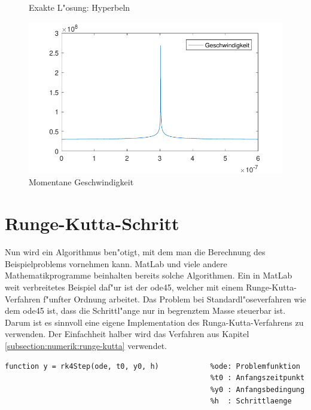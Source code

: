 \begin{refsection}
\begin{figure}
\caption{Exakte L"osung: Hyperbeln}
\label{image:hyperbelOptimal}
\end{figure}
\begin{figure}
\centering
\includegraphics{schrittlaenge/images/geschwindigkeitHyperbel.pdf}
\caption{Momentane Geschwindigkeit}
\label{image:geschwindigkeitHyperbel}
\end{figure}

\section{Runge-Kutta-Schritt\label{section:schrittlaenge:runge-kutta}}

Nun wird ein Algorithmus ben"otigt, mit dem man die Berechnung des Beispielproblems vornehmen kann.
MatLab und viele andere Mathematikprogramme beinhalten bereits solche Algorithmen.
Ein in MatLab weit verbreitetes Beispiel daf"ur ist der ode45, welcher mit einem Runge-Kutta-Verfahren f"unfter Ordnung arbeitet.
Das Problem bei Standardl"oseverfahren wie dem ode45 ist, dass die Schrittl"ange nur in begrenztem Masse steuerbar ist. 
Darum ist es sinnvoll eine eigene Implementation des Runga-Kutta-Verfahrens zu verwenden. Der Einfachheit halber wird das Verfahren aus Kapitel \ref{subsection:numerik:runge-kutta} verwendet. 
\begin{lstlisting}[style=Matlab, caption=Runge-Kutta-Schritt, captionpos=b, label=code:rk4Step] 
function y = rk4Step(ode, t0, y0, h)            %ode: Problemfunktion
                                                %t0 : Anfangszeitpunkt  
                                                %y0 : Anfangsbedingung 
                                                %h  : Schrittlaenge
                                                

\end{lstlisting}
\end{refsection}
